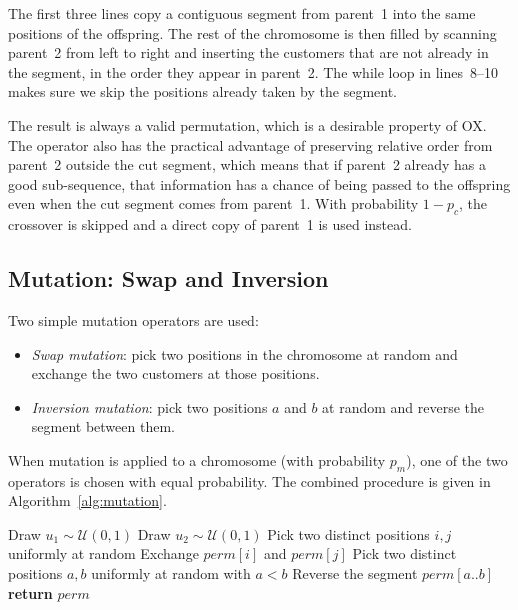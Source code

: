 \documentclass [a4paper, 11pt, titlepage] {article}
\begin{document}
The first three lines copy a contiguous segment from parent~1 into the same positions of the offspring. The rest of the chromosome is then filled by scanning parent~2 from left to right and inserting the customers that are not already in the segment, in the order they appear in parent~2. The while loop in lines~8--10 makes sure we skip the positions already taken by the segment.

The result is always a valid permutation, which is a desirable property of OX. The operator also has the practical advantage of preserving relative order from parent~2 outside the cut segment, which means that if parent~2 already has a good sub-sequence, that information has a chance of being passed to the offspring even when the cut segment comes from parent~1. With probability $1 - p_c$, the crossover is skipped and a direct copy of parent~1 is used instead.

\subsection{Mutation: Swap and Inversion}
\label{sec:mutation}

Two simple mutation operators are used:

\begin{itemize}
    \item \emph{Swap mutation}: pick two positions in the chromosome at random and exchange the two customers at those positions.
    \item \emph{Inversion mutation}: pick two positions $a$ and $b$ at random and reverse the segment between them.
\end{itemize}

When mutation is applied to a chromosome (with probability $p_m$), one of the two operators is chosen with equal probability. The combined procedure is given in Algorithm~\ref{alg:mutation}.

\begin{algorithm}[H]
\caption{Mutation Operator}
\label{alg:mutation}
\begin{algorithmic}[1]
    \State Draw $u_1 \sim \mathcal{U}(0,1)$
        \State Draw $u_2 \sim \mathcal{U}(0,1)$
         
            \State Pick two distinct positions $i, j$ uniformly at random
            \State Exchange $perm[i]$ and $perm[j]$
        \Else {}
            \State Pick two distinct positions $a, b$ uniformly at random with $a < b$
            \State Reverse the segment $perm[a..b]$
        \EndIf
    \EndIf
    \State \textbf{return} $perm$
\end{algorithmic}
\end{algorithm}
\end{document}
